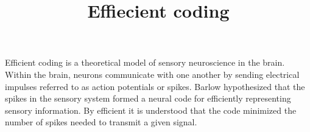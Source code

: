 \documentclass[a4paper]{article}
\title{Effiecient coding}
\date{}
\begin{document}
    \maketitle
    Efficient coding\cite{barlow-1961-possible-principles-underlying-the-transformation-of-sensory-messages} is a theoretical model of sensory neuroscience in the brain. Within the brain, neurons communicate with one another by sending electrical impulses referred to as action potentials or spikes. Barlow hypothesized that the spikes in the sensory system formed a neural code for efficiently representing sensory information. By efficient it is understood that the code minimized the number of spikes needed to transmit a given signal.
    
    
\end{document}
